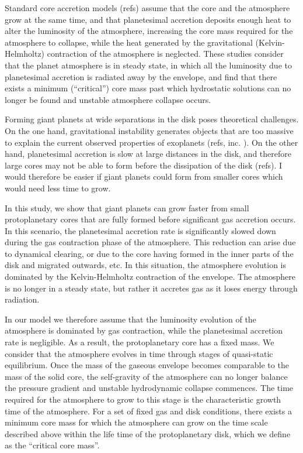 \documentclass[apj]{emulateapj}
\begin{document}
Standard core accretion models (refs) assume that the core and the atmosphere grow at the same time, and that planetesimal accretion deposits enough heat to alter the luminosity of the atmosphere, increasing the core mass required for the atmosphere to collapse, while the heat generated by the gravitational (Kelvin-Helmholtz) contraction of the atmosphere is neglected. These studies consider that the planet atmosphere is in steady state, in which all the luminosity due to planetesimal accretion is radiated away by the envelope, and  find that there exists a minimum (``critical'') core mass past which hydrostatic solutions can no longer be found and unstable atmosphere collapse occurs. 

Forming giant planets at wide separations in the disk poses theoretical challenges. On the one hand, gravitational instability generates objects that are too massive to explain the current observed properties of exoplanets (refs, inc. \citealt{rafikov05}). On the other hand, planetesimal accretion is slow at large distances in the disk, and therefore large cores may not be able to form before the dissipation of the disk (refs). I would therefore be easier if giant planets could form from smaller cores which would need less time to grow. 

In this study, we show that giant planets can grow faster from small protoplanetary cores that are fully formed before significant gas accretion occurs. In this scenario, the planetesimal accretion rate is significantly slowed down during the gas contraction phase of the atmosphere. This reduction can arise due to dynamical clearing, or due to the core having formed in the inner parts of the disk and migrated outwards, etc. In this situation, the atmosphere evolution is dominated by the Kelvin-Helmholtz contraction of the envelope. The atmosphere is no longer in a steady state, but rather it accretes gas as it loses energy through radiation. 

In our model we therefore assume that the luminosity evolution of the atmosphere is dominated by gas contraction, while the planetesimal accretion rate is negligible. As a result, the protoplanetary core has a fixed mass. We consider that the atmosphere evolves in time through stages of quasi-static equilibrium. Once the mass of the gaseous envelope becomes comparable to the mass of the solid core, the self-gravity of the atmosphere can no longer balance the pressure gradient and unstable hydrodynamic collapse commences. The time required for the atmosphere to grow to this stage is the characteristic growth time of the atmosphere. For a set of fixed gas and disk conditions, there exists a minimum core mass for which the atmosphere can grow on the time scale described above within the life time of the protoplanetary disk, which we define as the ``critical core mass''. 
\end{document}
